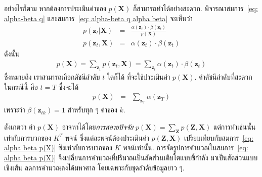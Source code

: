 อย่างไรก็ตาม 
หากต้องการประเมินค่าของ $p(\bm{X})$ ก็สามารถทำได้อย่างสะดวก.
พิจารณาสมการ~\ref{eq: alpha-beta q} และสมการ~\ref{eq: alpha-beta q alpha beta} จะเห็นว่า
\begin{eqnarray}
p(\bm{z}_t|\bm{X})
&=& \frac{\alpha(\bm{z}_t) \cdot \beta(\bm{z}_t)}{p(\bm{X})}
\nonumber \\
p(\bm{z}_t, \bm{X})
&=& \alpha(\bm{z}_t) \cdot \beta(\bm{z}_t)
\nonumber
\end{eqnarray}
ดังนั้น
\begin{eqnarray}
p(\bm{X}) = \sum_{\bm{z}_t} p(\bm{z}_t, \bm{X})
= \sum_{\bm{z}_t} \alpha(\bm{z}_t) \cdot \beta(\bm{z}_t)
\label{eq: alpha beta p(X) any t}
\end{eqnarray}
ซึ่งหมายถึง เราสามารถเลือกดัชนีลำดับ $t$ ใดก็ได้ ที่จะใช้ประเมินค่า $p(\bm{X})$.
ค่าดัชนีลำดับที่สะดวกในกรณีนี้ คือ $t = T$ ซึ่งจะได้
\begin{eqnarray}
p(\bm{X})
&=& \sum_{\bm{z}_T} \alpha(\bm{z}_T)
\label{eq: alpha beta p(X)}
\end{eqnarray}
เพราะว่า $\beta(\bm{z}_{tk}) = 1$ สำหรับทุก ๆ ค่าของ $k$.

สังเกตว่า
ค่า $p(\bm{X})$ อาจหาได้โดย\textit{การสลายปัจจัย} 
$p(\bm{X}) = \sum_{\bm{Z}} p(\bm{Z}, \bm{X})$
แต่การทำเช่นนั้นเท่ากับการบวกของ $K^T$ พจน์ ซึ่งแต่ละพจน์ต้องประเมินค่า $p(\bm{Z}, \bm{X})$
เปรียบเทียบกับสมการ~\ref{eq: alpha beta p(X)} ซึงเท่ากับการบวกของ $K$ พจน์เท่านั้น.
การจัดรูปการคำนวณในสมการ~\ref{eq: alpha beta p(X)} จึงเปลี่ยนการคำนวณที่ปริมาณเป็นสัดส่วนเติบโตแบบชี้กำลัง
มาเป็นสัดส่วนแบบเชิงเส้น ลดการคำนวณลงได้มหาศาล โดยเฉพาะกับชุดลำดับข้อมูลยาว ๆ.

